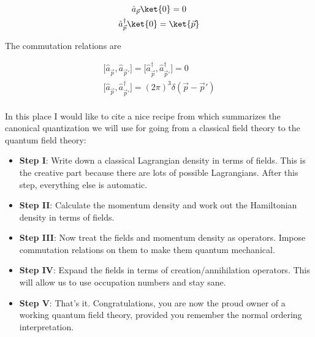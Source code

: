 \begin{equation*}
    \begin{gathered}
        \hat{a}_{\vec{p}} \ket{0} = 0 \\
        \hat{a}^{\dagger}_{\vec{p}} \ket{0} = \ket{\vec{p}}
    \end{gathered}
\end{equation*}

The commutation relations are

\begin{equation*}
    \begin{gathered}
        \big[\hat{a}_{\vec{p}}, \hat{a}_{\vec{p}'}\big] = \big[\hat{a}_{\vec{p}}^{\dagger}, \hat{a}_{\vec{p}'}^{\dagger}\big] = 0 \\
        \big[\hat{a}_{\vec{p}}, \hat{a}_{\vec{p}'}^{\dagger}\big] = (2 \pi)^{3} \delta(\vec{p} - \vec{p}')
    \end{gathered}
\end{equation*}

\paragraph{} In this place I would like to cite a nice recipe from \cite{gifted_amateur} which summarizes
the canonical quantization we will use for going from a classical field theory to the quantum 
field theory:

\begin{itemize}
    \item \textbf{Step I}: Write down a classical Lagrangian density in terms of fields. This is the creative part because there are lots of 
        possible Lagrangians. After this step, everything else is automatic.
    \item \textbf{Step II}: Calculate the momentum density and work out the Hamiltonian density in terms of fields.
    \item \textbf{Step III}: Now treat the fields and momentum density as operators. Impose commutation relations on them to make them 
        quantum mechanical.
    \item \textbf{Step IV}: Expand the fields in terms of creation/annihilation operators. This will allow us to use occupation numbers 
        and stay sane.
    \item \textbf{Step V}: That's it. Congratulations, you are now the proud owner of a working quantum field theory, provided you remember 
        the normal ordering interpretation.
\end{itemize}

